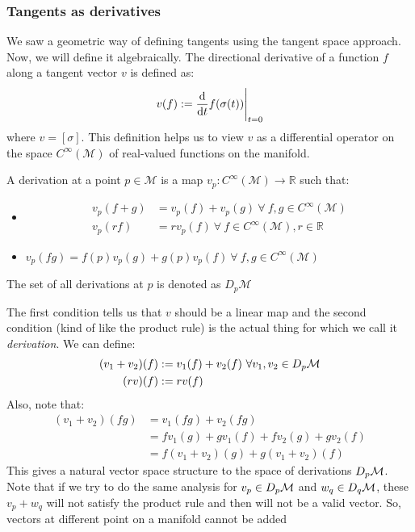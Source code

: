 \subsubsection{Tangents as derivatives}
We saw a geometric way of defining tangents using the tangent space approach. Now, we will define it algebraically. The directional derivative of a function $f$ along a tangent  vector $v$ is defined as:
$$v(f) := \dv{t}f(\sigma(t))\Bigg|_{t=0}$$
where $v = [\sigma]$. This definition helps us to view $v$ as a differential operator on the space $C^\infty(\mathcal{M})$ of real-valued functions on the manifold. 
\begin{definition}[Derivations]
  A derivation at a point $p\in\mathcal{M}$ is a map $v_p:C^\infty(\mathcal{M})\rightarrow \mathbb{R}$ such that:
  \begin{itemize}
    \item 
    \begin{align*}
      v_p(f+g) &= v_p(f) + v_p(g) \ \forall \ f,g\in C^\infty(\mathcal{M})\\
      v_p(rf) &= r v_p(f) \ \forall \ f \in C^\infty(\mathcal{M}), r \in \mathbb{R}
    \end{align*}
    \item $v_p(fg) = f(p)v_p(g)+ g(p)v_p(f)\ \forall \ f,g\in C^\infty(\mathcal{M})$
  \end{itemize}
  The set of all derivations at $p$ is denoted as $D_p\mathcal{M}$
\end{definition}
The first condition tells us that $v$ should be a linear map and the second condition (kind of like the product rule) is the actual thing for which we call it \textit{derivation}. We can define:
\begin{align*}
  (v_1+v_2)(f) &:=v_1(f)+v_2(f) \ \forall v_1,v_2\in D_p\mathcal M\\
(rv)(f) &:= rv(f)
\end{align*}
Also, note that:
\begin{align*}
  (v_1+v_2)(fg) &= v_1(fg) + v_2(fg) \\
  &= fv_1(g) + gv_1(f) + fv_2(g) + gv_2(f)\\
  &=f(v_1+v_2)(g) + g(v_1+v_2)(f)
\end{align*}
This gives a natural vector space structure to the space of derivations $D_p\mathcal M$. Note that if we try to do the same analysis for $v_p\in D_p\mathcal M$ and $w_q\in D_q\mathcal M$, these $v_p+w_q$ will not satisfy the product rule and then will not be a valid vector. So, vectors at different point on a manifold cannot be added \\[0.2cm] 
